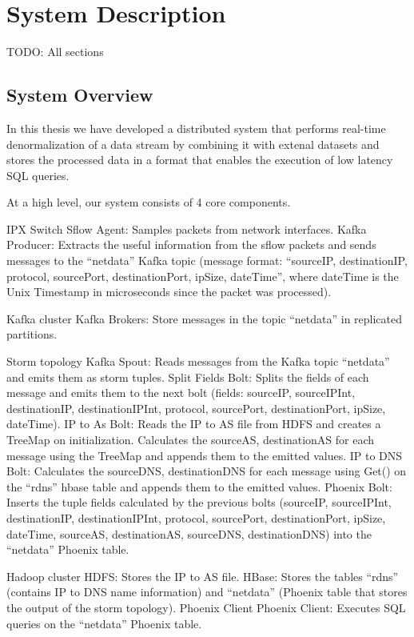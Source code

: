 \chapter{System Description}

TODO: All sections

\section{System Overview}

In this thesis we have developed a distributed system that performs real-time denormalization of a data stream by combining it with extenal datasets and stores the processed data in a format that enables the execution of low latency SQL queries. 

At a high level, our system consists of 4 core components. 

IPX Switch
Sflow Agent: Samples packets from network interfaces.
Kafka Producer: Extracts the useful information from the sflow packets and
sends messages to the “netdata” Kafka topic (message format: “sourceIP,
destinationIP, protocol, sourcePort, destinationPort, ipSize, dateTime”,
where dateTime is the Unix Timestamp in microseconds since the packet was
processed).

Kafka cluster
Kafka Brokers: Store messages in the topic “netdata” in replicated partitions.

Storm topology
Kafka Spout: Reads messages from the Kafka topic “netdata” and emits them
as storm tuples.
Split Fields Bolt: Splits the fields of each message and emits them to the next
bolt (fields: sourceIP, sourceIPInt, destinationIP, destinationIPInt, protocol,
sourcePort, destinationPort, ipSize, dateTime).
IP to As Bolt: Reads the IP to AS file from HDFS and creates a TreeMap on
initialization. Calculates the sourceAS, destinationAS for each message using
the TreeMap and appends them to the emitted values.
IP to DNS Bolt: Calculates the sourceDNS, destinationDNS for each message
using Get() on the “rdns” hbase table and appends them to the emitted
values.
Phoenix Bolt: Inserts the tuple fields calculated by the previous bolts
(sourceIP, sourceIPInt, destinationIP, destinationIPInt, protocol, sourcePort,
destinationPort, ipSize, dateTime, sourceAS, destinationAS, sourceDNS,
destinationDNS) into the “netdata” Phoenix table.

Hadoop cluster
HDFS: Stores the IP to AS file.
HBase: Stores the tables “rdns” (contains IP to DNS name information) and
“netdata” (Phoenix table that stores the output of the storm topology).
Phoenix Client
Phoenix Client: Executes SQL queries on the “netdata” Phoenix table.

